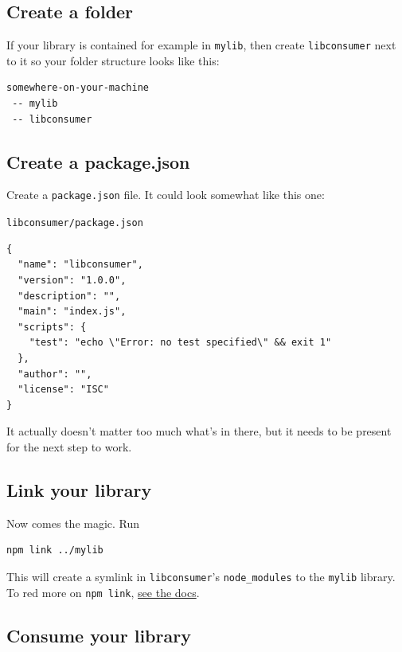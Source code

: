 \documentclass[12pt,a4paper]{article}
\newcommand{\filelabel}[1]{{\footnotesize\color{dkgreen}\texttt{#1}}{\vspace{-0.2cm}}}
\begin{document}
\subsection{\texorpdfstring{ Create a
folder}{Create a folder}}\label{step-1-create-a-folder}

If your library is contained for example in \texttt{mylib}, then create
\texttt{libconsumer} next to it so your folder structure looks like
this:

\begin{lstlisting}
somewhere-on-your-machine
 -- mylib
 -- libconsumer
\end{lstlisting}

\subsection{\texorpdfstring{ Create a
package.json}{Create a package.json}}\label{step-2-create-a-package.json}

Create a \texttt{package.json} file. It could look somewhat like this
one:

\filelabel{libconsumer/package.json}
\begin{lstlisting}
{
  "name": "libconsumer",
  "version": "1.0.0",
  "description": "",
  "main": "index.js",
  "scripts": {
    "test": "echo \"Error: no test specified\" && exit 1"
  },
  "author": "",
  "license": "ISC"
}
\end{lstlisting}

It actually doesn't matter too much what's in there, but it needs to be
present for the next step to work.

\subsection{\texorpdfstring{ Link your
library}{Link your library}}\label{step-3-link-your-library}

Now comes the magic. Run

\begin{lstlisting}
npm link ../mylib
\end{lstlisting}

This will create a symlink in \texttt{libconsumer}'s
\texttt{node\_modules} to the \texttt{mylib} library. To red more on
\texttt{npm\ link}, \href{https://docs.npmjs.com/cli/link}{see the
docs}.

\subsection{\texorpdfstring{{} Consume your
library}{Consume your library}}\label{step-4-consume-your-library}
\end{document}
